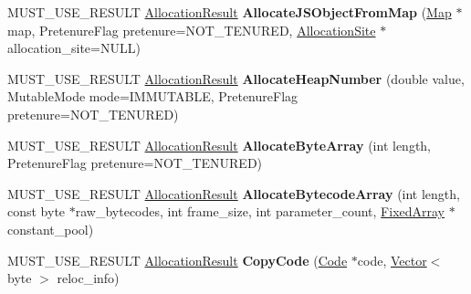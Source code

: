 \begin{DoxyCompactItemize}
\item 
M\+U\+S\+T\+\_\+\+U\+S\+E\+\_\+\+R\+E\+S\+U\+LT \hyperlink{classv8_1_1internal_1_1_allocation_result}{Allocation\+Result} {\bfseries Allocate\+J\+S\+Object\+From\+Map} (\hyperlink{classv8_1_1internal_1_1_map}{Map} $\ast$map, Pretenure\+Flag pretenure=N\+O\+T\+\_\+\+T\+E\+N\+U\+R\+ED, \hyperlink{classv8_1_1internal_1_1_allocation_site}{Allocation\+Site} $\ast$allocation\+\_\+site=N\+U\+LL)\hypertarget{classv8_1_1internal_1_1_heap_a002eaf7c9e2d2adbfb7be7e41c73000c}{}\label{classv8_1_1internal_1_1_heap_a002eaf7c9e2d2adbfb7be7e41c73000c}

\item 
M\+U\+S\+T\+\_\+\+U\+S\+E\+\_\+\+R\+E\+S\+U\+LT \hyperlink{classv8_1_1internal_1_1_allocation_result}{Allocation\+Result} {\bfseries Allocate\+Heap\+Number} (double value, Mutable\+Mode mode=I\+M\+M\+U\+T\+A\+B\+LE, Pretenure\+Flag pretenure=N\+O\+T\+\_\+\+T\+E\+N\+U\+R\+ED)\hypertarget{classv8_1_1internal_1_1_heap_aad75916606ac37d12afd49e46af5f147}{}\label{classv8_1_1internal_1_1_heap_aad75916606ac37d12afd49e46af5f147}

\item 
M\+U\+S\+T\+\_\+\+U\+S\+E\+\_\+\+R\+E\+S\+U\+LT \hyperlink{classv8_1_1internal_1_1_allocation_result}{Allocation\+Result} {\bfseries Allocate\+Byte\+Array} (int length, Pretenure\+Flag pretenure=N\+O\+T\+\_\+\+T\+E\+N\+U\+R\+ED)\hypertarget{classv8_1_1internal_1_1_heap_a6207df008d6b18eb129a1d24f5ccbc9f}{}\label{classv8_1_1internal_1_1_heap_a6207df008d6b18eb129a1d24f5ccbc9f}

\item 
M\+U\+S\+T\+\_\+\+U\+S\+E\+\_\+\+R\+E\+S\+U\+LT \hyperlink{classv8_1_1internal_1_1_allocation_result}{Allocation\+Result} {\bfseries Allocate\+Bytecode\+Array} (int length, const byte $\ast$raw\+\_\+bytecodes, int frame\+\_\+size, int parameter\+\_\+count, \hyperlink{classv8_1_1internal_1_1_fixed_array}{Fixed\+Array} $\ast$constant\+\_\+pool)\hypertarget{classv8_1_1internal_1_1_heap_a97c206bbefddf030b3d55327e3aa0a38}{}\label{classv8_1_1internal_1_1_heap_a97c206bbefddf030b3d55327e3aa0a38}

\item 
M\+U\+S\+T\+\_\+\+U\+S\+E\+\_\+\+R\+E\+S\+U\+LT \hyperlink{classv8_1_1internal_1_1_allocation_result}{Allocation\+Result} {\bfseries Copy\+Code} (\hyperlink{classv8_1_1internal_1_1_code}{Code} $\ast$code, \hyperlink{classv8_1_1internal_1_1_vector}{Vector}$<$ byte $>$ reloc\+\_\+info)\hypertarget{classv8_1_1internal_1_1_heap_acc48327087d89c576d748399346f282d}{}\label{classv8_1_1internal_1_1_heap_acc48327087d89c576d748399346f282d}


\end{DoxyCompactItemize}
